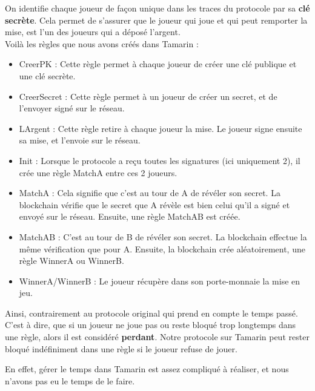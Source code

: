 \documentclass[conference]{IEEEtran}
\begin{document}
On identifie chaque joueur de façon unique dans les traces du protocole par sa \textbf{clé secrète}. Cela permet de s'assurer que le joueur qui joue et qui peut remporter la mise, est l'un des joueurs qui a déposé l'argent.\\
Voilà les règles que nous avons créés dans Tamarin : 
\begin{itemize}
    \item CreerPK : Cette règle permet à chaque joueur de créer une clé publique et une clé secrète.
    \item CreerSecret : Cette règle permet à un joueur de créer un secret, et de l'envoyer signé sur le réseau.
    \item LArgent : Cette règle retire à chaque joueur la mise. Le joueur signe ensuite sa mise, et l'envoie sur le réseau.
    \item Init : Lorsque le protocole a reçu toutes les signatures (ici uniquement 2), il crée une règle MatchA entre ces 2 joueurs.
    \item MatchA : Cela signifie que c'est au tour de A de révéler son secret. La blockchain vérifie que le secret que A révèle est bien celui qu'il a signé et envoyé sur le réseau. Ensuite, une règle MatchAB est créée.
    \item MatchAB : C'est au tour de B de révéler son secret. La blockchain effectue la même vérification que pour A. Ensuite, la blockchain crée aléatoirement, une règle WinnerA ou WinnerB.
    \item WinnerA/WinnerB : Le joueur récupère dans son porte-monnaie la mise en jeu.
\end{itemize}
\vspace{0.3cm}

Ainsi, contrairement au protocole original \cite{955} qui prend en compte le temps passé. C'est à dire, que si un joueur ne joue pas ou reste bloqué trop longtemps dans une règle, alors il est considéré \textbf{perdant}. Notre protocole sur Tamarin peut rester bloqué indéfiniment dans une règle si le joueur refuse de jouer.

En effet, gérer le temps dans Tamarin est assez compliqué à réaliser, et nous n'avons pas eu le temps de le faire. 
\end{document}
